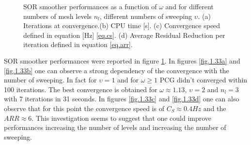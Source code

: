 \begin{figure}[hbt!]
{                             }
              \caption{SOR smoother performances as a function of $\omega$ and for different numbers of mesh levels $n_l$, different numbers of sweeping $\upsilon$. (a) Iterations at convergence.(b) CPU time [s]. (c) Convergence speed defined in equation [Hz] \ref{eq.cs}. (d) Average Residual Reduction per iteration defined in equation \ref{eq.arr}.}
              \label{f.1.33}
            \end{figure}
            SOR smoother performances were reported in figure \ref{f.1.33}. In figures \ref{fig.1.33a}  and \ref{fig.1.33b} one can observe a strong dependency of the convergence with the number of sweeping. In fact for $\upsilon=1$ and for $\omega\geq 1$ PCG didn't converged within 100 iterations. The best convergence is obtained for $\omega\approx1.13$, $\upsilon=2$ and $n_l=3$ with 7 iterations in 31 seconds. In figures \ref{fig.1.33c}  and \ref{fig.1.33d} one can also observe that for this point the convergence speed is of $C_S\approx0.4Hz$ and the $ARR\approx6$. This investigation seems to suggest that one could improve performances increasing the number of levels and increasing the number of sweeping. 
